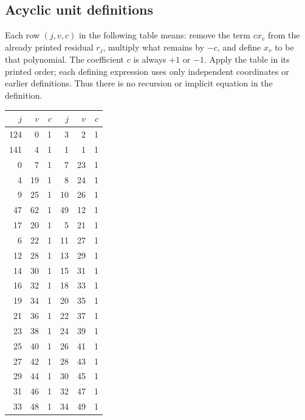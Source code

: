 \subsection{Acyclic unit definitions}
Each row $(j,v,c)$ in the following table means: remove the term $c x_v$
from the already printed residual $r_j$, multiply what remains by $-c$,
and define $x_v$ to be that polynomial. The coefficient $c$ is always $+1$
or $-1$. Apply the table in its printed order; each defining expression
uses only independent coordinates or earlier definitions. Thus there is
no recursion or implicit equation in the definition.
\begin{longtable}{rrr@{\qquad}rrr}
\toprule
$j$&$v$&$c$&$j$&$v$&$c$\\\midrule\endhead


124&0&1&3&2&1\\

141&4&1&1&1&1\\

0&7&1&7&23&1\\

4&19&1&8&24&1\\

9&25&1&10&26&1\\

47&62&1&49&12&1\\

17&20&1&5&21&1\\

6&22&1&11&27&1\\

12&28&1&13&29&1\\

14&30&1&15&31&1\\

16&32&1&18&33&1\\

19&34&1&20&35&1\\

21&36&1&22&37&1\\

23&38&1&24&39&1\\

25&40&1&26&41&1\\

27&42&1&28&43&1\\

29&44&1&30&45&1\\

31&46&1&32&47&1\\

33&48&1&34&49&1\\


\end{longtable}
